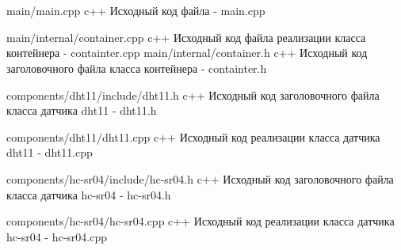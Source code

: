 \documentclass{bmstu}
\begin{document}
    \begin{appendices}
        \chapter{}
        \chapter{}


        \chapter{}
        {main/main.cpp} %
        {c++}
        {Исходный код файла - main.cpp} %

        {main/internal/container.cpp} %
        {c++}
        {Исходный код файла реализации класса контейнера  - containter.cpp} %
        {main/internal/container.h} %
        {c++}
        {Исходный код заголовочного файла класса контейнера - containter.h} %

        {components/dht11/include/dht11.h} %
        {c++}
        {Исходный код заголовочного файла класса датчика dht11 - dht11.h} %

        {components/dht11/dht11.cpp} %
        {c++}
        {Исходный код реализации класса датчика dht11 - dht11.cpp} %

        {components/hc-sr04/include/hc-sr04.h} %
        {c++}
        {Исходный код заголовочного файла класса датчика hc-sr04 - hc-sr04.h} %

        {components/hc-sr04/hc-sr04.cpp} %
        {c++}
        {Исходный код реализации класса датчика hc-sr04 - hc-sr04.cpp} %


\end{appendices}
\end{document}
